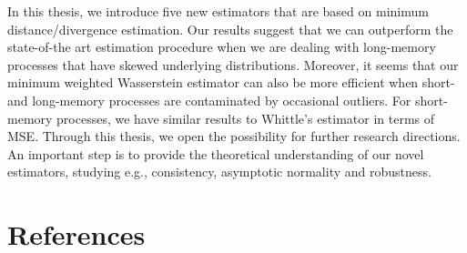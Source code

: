\documentclass[
  11pt,
]{article}
\begin{document}
In this thesis, we introduce five new estimators that are based on
minimum distance/divergence estimation. Our results suggest that we can
outperform the state-of-the art estimation procedure when we are dealing
with long-memory processes that have skewed underlying distributions.
Moreover, it seems that our minimum weighted Wasserstein estimator can
also be more efficient when short- and long-memory processes are
contaminated by occasional outliers. For short-memory
processes, we have similar results to Whittle's estimator in terms of
MSE. Through this thesis, we open the possibility for further research
directions. An important step is to provide the theoretical understanding
of our novel estimators, studying e.g., consistency, asymptotic
normality and robustness.

\newpage

\hypertarget{references}{%
\section*{References}\label{references}}
\end{document}
